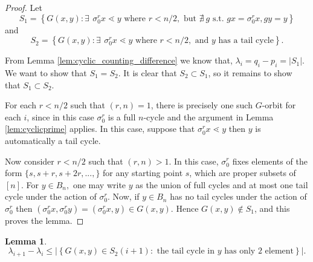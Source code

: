 \documentclass[10 pt]{amsart}
\theoremstyle{plain}
\newtheorem{lem}[thm]{Lemma}
\theoremstyle{definition}
\theoremstyle{remark}
\numberwithin{equation}{section}
\begin{document}
\begin{proof}

Let $$S_1 = \left\{G{(x, y)} : \exists \: \, \sigma_0^r x \lessdot y \text{ where } r < n/2, \text{ but } \nexists \:  g \text{ s.t. } g x = \sigma_0 ^r x, g y = y \right\} $$ and $$S_2= \left\{ G(x, y):  \exists \: \, \sigma_0^r x \lessdot y \text{ where } r < n/2,  \text{ and } y \text{ has a tail cycle}  \right\}.$$

From Lemma \ref{lem:cyclic_counting_difference} we know that,  $\lambda_i = q_i - p_i = |S_1|$. We want to show that $S_1 = S_2$. It is clear that $S_2 \subset S_1$, so it remains to show that $S_1 \subset S_2$. 

For each $r < n/2$ such that $(r, n) = 1$, there is precisely one such $G$-orbit for each $i$, since in this case $\sigma_0^r$ is a full $n$-cycle and the argument in Lemma \ref{lem:cyclicprime} applies. In this case, suppose that $\sigma_0^r x \lessdot y$ then $y$ is automatically a tail cycle. 

Now consider $r < n/2$ such that $(r, n) > 1$. In this case, $\sigma_0^r$ fixes elements of the form $\{s, s+r, s+2r, ..., \}$ for any starting point $s$, which are proper subsets of $[n]$. For $y \in B_n,$ one may write $y$ as the union of full cycles and at most one tail cycle under the action of $\sigma_0^r$. Now, if $y \in B_n$ has no tail cycles under the action of $\sigma_0^r$ then $(\sigma_0^rx , \sigma_0^ry)= (\sigma_0^rx , y) \in G(x, y).$ Hence $G(x, y) \notin S_1$, and this proves the lemma. 
\end{proof}


\begin{lem} \label{lem:bounding_sublemma2}
$$\lambda_{i+1} - \lambda_i \le | \left\{ G(x, y) \in S_2(i+1) : \text{ the tail cycle in } y \text{ has only } 2 \text{ element}\right\}|.$$
\end{lem}
\end{document}
